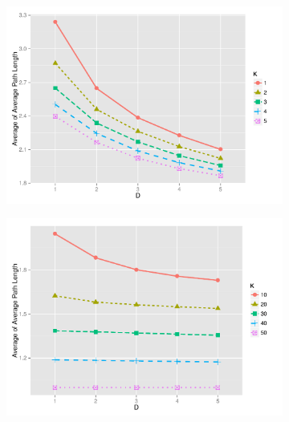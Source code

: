 \documentclass[preprint,number]{elsarticle}
\begin{document}
        \begin{figure}[H]
          \centering
          \begin{subfigure}{.5\linewidth}
            \centering
            \includegraphics[width=1\linewidth]{"../analysis/pdf/network_properties_apl_line_sf_kreg_12345"}
            \caption{}
            \label{fig:network_properties_apl_line_sf_kreg_12345}
          \end{subfigure}%
          \begin{subfigure}{.5\linewidth}
            \centering
            \includegraphics[width=1\linewidth]{"../analysis/pdf/network_properties_apl_line_sf_kreg_1020304050"}
            \caption{}
            \label{fig:network_properties_apl_line_sf_kreg_1020304050}
          \end{subfigure}

\end{figure}
\end{document}
